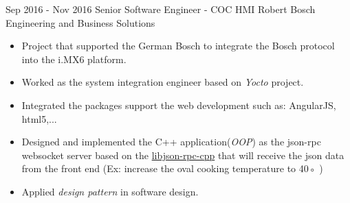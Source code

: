 \documentclass[letterpaper]{twentysecondcv} %
\begin{document}
\begin{twenty}
	\twentyitem
    	{Sep 2016 -}
		{Nov 2016}
        {Senior Software Engineer - COC HMI}
        {{Robert Bosch Engineering and Business Solutions}}
        {}
        {\begin{itemize}
        \item Project that supported the German Bosch to integrate the Bosch protocol into the i.MX6
        platform.
        \item Worked as the system integration engineer based on \textit{Yocto} project.
        \item Integrated the packages support the web development such as: AngularJS, html5,...
        \item Designed and implemented the C++ application(\textit{OOP}) as the json-rpc websocket server based
        on the \href{https://github.com/cinemast/libjson-rpc-cpp}{libjson-rpc-cpp} that will receive the json data from the front end (Ex: increase the oval cooking temperature to 40◦ )
        \item Applied \textit{design pattern} in software design.
        \end{itemize}}
\end{twenty}

\newpage
\makeprofile
\end{document}
